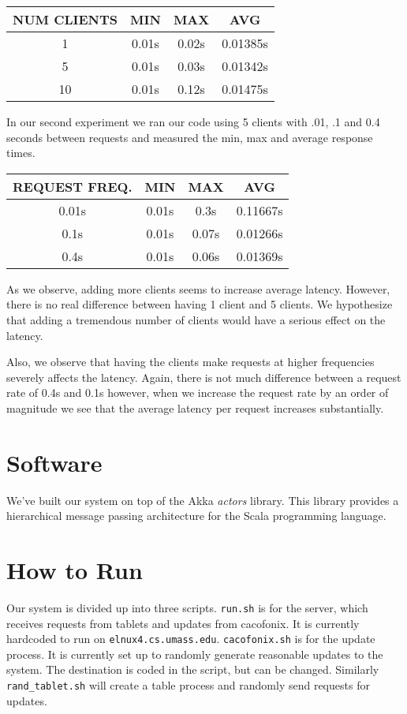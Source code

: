 \documentclass[11pt]{article}
\begin{document}
\begin{tabular}{c|c|c|c}
  NUM CLIENTS & MIN & MAX & AVG \\
  \hline
  1  & 0.01s & 0.02s & 0.01385s \\
  5  & 0.01s & 0.03s & 0.01342s \\
  10 & 0.01s & 0.12s & 0.01475s \\
\end{tabular}

In our second experiment we ran our code using 5 clients with .01, .1
and 0.4 seconds between requests and measured the min, max and
average response times.


\begin{tabular}{c|c|c|c}
  REQUEST FREQ. & MIN & MAX & AVG \\
  \hline
  0.01s & 0.01s & 0.3s  & 0.11667s \\
  0.1s  & 0.01s & 0.07s & 0.01266s \\
  0.4s  & 0.01s & 0.06s & 0.01369s \\
\end{tabular}

As we observe, adding more clients seems to increase average
latency.  However, there is no real difference between having 1 client
and 5 clients.  We hypothesize that adding a tremendous number of
clients would have a serious effect on the latency.

Also, we observe that having the clients make requests at higher
frequencies severely affects the latency.  Again, there is not much
difference between a request rate of 0.4s and 0.1s however, when we
increase the request rate by an order of magnitude we see that the
average latency per request increases substantially.

\section{Software}
We've built our system on top of the Akka \emph{actors} library.  This
library provides a hierarchical message passing architecture for the
Scala programming language.

\section{How to Run}

Our system is divided up into three scripts. \texttt{run.sh} is for the server, which receives requests from tablets and updates from cacofonix. It is currently hardcoded to run on \texttt{elnux4.cs.umass.edu}. \texttt{cacofonix.sh} is for the update process. It is currently set up to randomly generate reasonable updates to the system. The destination is coded in the script, but can be changed. Similarly \texttt{rand_tablet.sh} will create a table process and randomly send requests for updates. 
\end{document}
